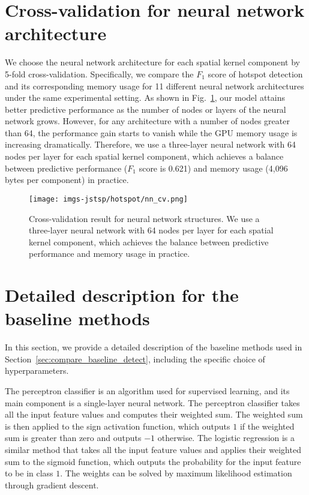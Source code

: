 \documentclass[journal]{IEEEtran}
\begin{document}
\section{Cross-validation for neural network architecture}
\label{append:cv-nn-res}

We choose the neural network architecture for each spatial kernel component by 5-fold cross-validation. 
Specifically, we compare the $F_1$ score of hotspot detection and its corresponding memory usage for 11 different neural network architectures under the same experimental setting. 
As shown in Fig.~\ref{fig:cv-nn-outofsample}, our model attains better predictive performance as the number of nodes or layers of the neural network grows. However, for any architecture with a number of nodes greater than 64, the performance gain starts to vanish while the GPU memory usage is increasing dramatically.
Therefore, we use a three-layer neural network with 64 nodes per layer for each spatial kernel component, which achieves a balance between predictive performance ($F_1$ score is 0.621) and memory usage (4,096 bytes per component) in practice.

\begin{figure}[!h]
    \centering
    \texttt{[image: imgs-jstsp/hotspot/nn\_cv.png]}
    \caption{Cross-validation result for neural network structures. We use a three-layer neural network with 64 nodes per layer for each spatial kernel component, which achieves the balance between predictive performance and memory usage in practice.}
    \label{fig:cv-nn-outofsample}
\end{figure}

\section{Detailed description for the baseline methods}
\label{app:baseline}

In this section, we provide a detailed description of the baseline methods used in Section~\ref{sec:compare_baseline_detect}, including the specific choice of hyperparameters. 

The perceptron classifier is an algorithm used for supervised learning, and its main component is a single-layer neural network. The perceptron classifier takes all the input feature values and computes their weighted sum. The weighted sum is then applied to the sign activation function, which outputs $1$ if the weighted sum is greater than zero and outputs $-1$ otherwise. The logistic regression is a similar method that takes all the input feature values and applies their weighted sum to the sigmoid function, which outputs the probability for the input feature to be in class $1$. The weights can be solved by maximum likelihood estimation through gradient descent. 
\end{document}
